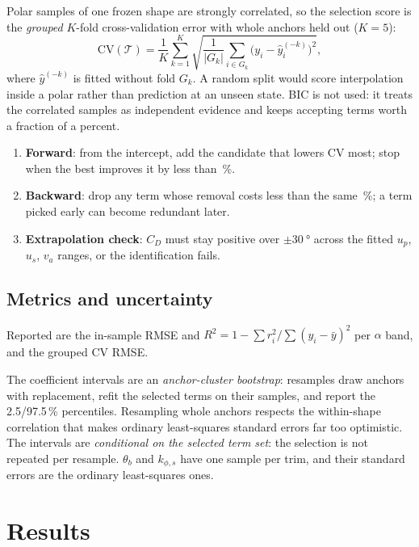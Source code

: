 \documentclass[11pt,a4paper]{article}
\begin{document}
Polar samples of one frozen shape are strongly correlated, so the selection
score is the \emph{grouped} $K$-fold cross-validation error with whole anchors
held out ($K=5$):
\begin{equation}
  \mathrm{CV}(\mathcal T)=\frac1K\sum_{k=1}^K
  \sqrt{\frac{1}{|G_k|}\sum_{i\in G_k}\bigl(y_i-\hat y_i^{(-k)}\bigr)^2},
\end{equation}
where $\hat y^{(-k)}$ is fitted without fold $G_k$. A random split would score
interpolation inside a polar rather than prediction at an unseen state. BIC
is not used: it treats the correlated samples as independent evidence and
keeps accepting terms worth a fraction of a percent.

\begin{enumerate}
  \item \textbf{Forward}: from the intercept, add the candidate that lowers
        $\mathrm{CV}$ most; stop when the best improves it by less than
        \minImprovementPct\,\%.
  \item \textbf{Backward}: drop any term whose removal costs less than the same
        \minImprovementPct\,\%; a term picked early can become redundant later.
  \item \textbf{Extrapolation check}: $C_D$ must stay positive over
        $\pm\SI{30}{\degree}$ across the fitted $u_p$, $u_s$, $v_a$ ranges, or
        the identification fails.
\end{enumerate}

\subsection{Metrics and uncertainty}
Reported are the in-sample RMSE and $R^2=1-\sum r_i^2/\sum(y_i-\bar y)^2$ per
$\alpha$ band, and the grouped CV RMSE.

The coefficient intervals are an \emph{anchor-cluster bootstrap}: \nBoot{}
resamples draw anchors with replacement, refit the selected terms on their
samples, and report the 2.5/97.5\,\% percentiles. Resampling whole anchors
respects the within-shape correlation that makes ordinary least-squares
standard errors far too optimistic. The intervals are \emph{conditional on the
selected term set}: the selection is not repeated per resample. $\theta_b$
and $k_{\phi,s}$ have one sample per trim, and their standard errors are the
ordinary least-squares ones.

\section{Results}
\label{sec:results}
\end{document}
